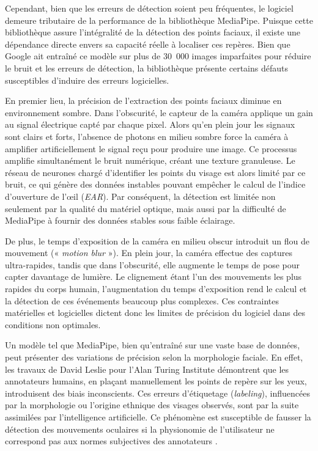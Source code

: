 \documentclass{rapportbrebeuf}
\begin{document}
Cependant, bien que les erreurs de détection soient peu fréquentes, le logiciel demeure tributaire de la performance de la bibliothèque MediaPipe. Puisque cette bibliothèque assure l'intégralité de la détection des points faciaux, il existe une dépendance directe envers sa capacité réelle à localiser ces repères. Bien que Google ait entraîné ce modèle sur plus de 30~000 images imparfaites pour réduire le bruit et les erreurs de détection, la bibliothèque présente certains défauts susceptibles d'induire des erreurs logicielles.

En premier lieu, la précision de l'extraction des points faciaux diminue en environnement sombre. Dans l'obscurité, le capteur de la caméra applique un gain au signal électrique capté par chaque pixel. Alors qu'en plein jour les signaux sont clairs et forts, l'absence de photons en milieu sombre force la caméra à amplifier artificiellement le signal reçu pour produire une image. Ce processus amplifie simultanément le bruit numérique, créant une texture granuleuse. Le réseau de neurones chargé d'identifier les points du visage est alors limité par ce bruit, ce qui génère des données instables pouvant empêcher le calcul de l'indice d'ouverture de l'œil (\textit{EAR}). Par conséquent, la détection est limitée non seulement par la qualité du matériel optique, mais aussi par la difficulté de MediaPipe à fournir des données stables sous faible éclairage.

De plus, le temps d'exposition de la caméra en milieu obscur introduit un flou de mouvement (« \textit{motion blur} »). En plein jour, la caméra effectue des captures ultra-rapides, tandis que dans l'obscurité, elle augmente le temps de pose pour capter davantage de lumière. Le clignement étant l'un des mouvements les plus rapides du corps humain, l'augmentation du temps d'exposition rend le calcul et la détection de ces événements beaucoup plus complexes. Ces contraintes matérielles et logicielles dictent donc les limites de précision du logiciel dans des conditions non optimales.

Un modèle tel que MediaPipe, bien qu'entraîné sur une vaste base de données, peut présenter des variations de précision selon la morphologie faciale. En effet, les travaux de David Leslie pour l'Alan Turing Institute démontrent que les annotateurs humains, en plaçant manuellement les points de repère sur les yeux, introduisent des biais inconscients. Ces erreurs d'étiquetage (\textit{labeling}), influencées par la morphologie ou l'origine ethnique des visages observés, sont par la suite assimilées par l'intelligence artificielle. Ce phénomène est susceptible de fausser la détection des mouvements oculaires si la physionomie de l'utilisateur ne correspond pas aux normes subjectives des annotateurs \cite{leslie2020understanding}.
\end{document}
